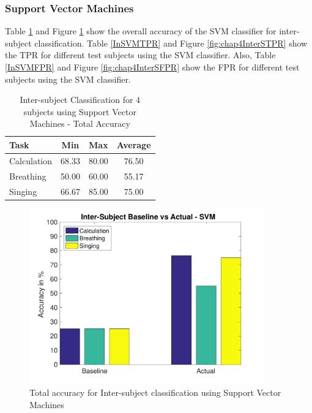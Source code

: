 		\subsubsection{Support Vector Machines}
    Table \ref{InSVM} and Figure \ref{fig:chap4InterST} show the overall accuracy of the SVM classifier for inter-subject classification. Table \ref{InSVMTPR} and Figure \ref{fig:chap4InterSTPR} show the TPR for different test subjects using the SVM classifier. Also, Table \ref{InSVMFPR} and Figure \ref{fig:chap4InterSFPR} show the FPR for different test subjects using the SVM classifier.        
		\begin{table}[h!]
			\centering
			\caption{Inter-subject Classification for 4 subjects using Support Vector Machines - Total Accuracy}
			\label{InSVM}
			\begin{tabular}{l c c c}
				\hline
				Task &Min &Max &Average\\\hline
				Calculation &68.33 &80.00 &76.50\\
				Breathing &50.00 &60.00   &55.17\\
				Singing &66.67 &85.00     &75.00\\
			\end{tabular}
		\end{table}

		\begin{figure}[hbtp]
	    	\centering
	    	\includegraphics[width=0.90\textwidth]{Chapter-4/base_tis}
	    	\caption{Total accuracy for Inter-subject classification using Support Vector Machines}
	    	\label{fig:chap4InterST}
    	\end{figure}

